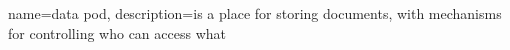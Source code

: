 {
  name=data pod,
  description={is a place for storing documents, with mechanisms for controlling who can access what}
}